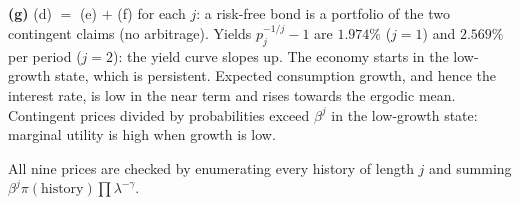 \documentclass[12pt, letterpaper]{article}
\begin{document}
\begin{tcolorbox}[evenbox,title={Exercise 8.4 \quad Term structure of interest rates}]
\textbf{(g)} (d) $=$ (e) $+$ (f) for each $j$: a risk-free bond is a portfolio of the two contingent claims
(no arbitrage). Yields $p_j^{-1/j}-1$ are $1.974\%$ ($j=1$) and $2.569\%$ per period ($j=2$): the yield curve slopes
up. The economy starts in the low-growth state, which is persistent. Expected consumption growth, and hence the interest
rate, is low in the near term and rises towards the ergodic mean. Contingent prices divided by probabilities
exceed $\beta^j$ in the low-growth state: marginal utility is high when growth is low.

\begin{tcolorbox}[databox]
All nine prices are checked by enumerating every history of length $j$ and summing
$\beta^j\pi(\text{history})\prod\lambda^{-\gamma}$.
\end{tcolorbox}
\end{tcolorbox}
\end{document}
